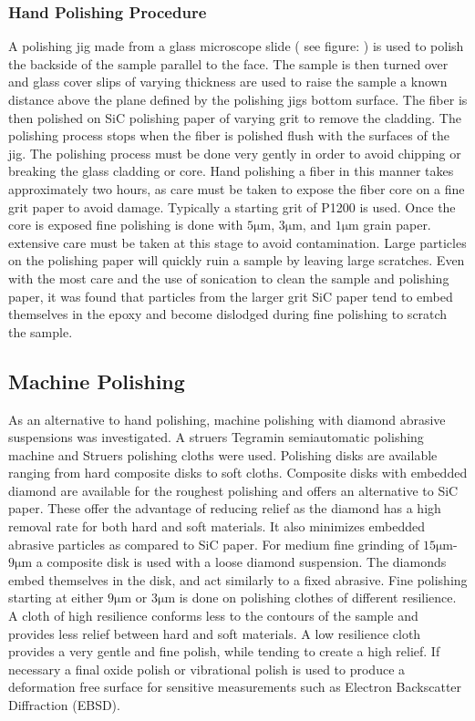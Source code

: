 \subsubsection{Hand Polishing Procedure}
A polishing jig made from a glass microscope slide ( see figure: ) is used to polish the backside of the sample parallel to the face. The sample is then turned over and glass cover slips of varying thickness are used to raise the sample a known distance above the plane defined by the polishing jigs bottom surface. The fiber is then polished on SiC polishing paper of varying grit to remove the cladding. The polishing process stops when the fiber is polished flush with the surfaces of the jig. The polishing process must be done very gently in order to avoid chipping or breaking the glass cladding or core. Hand polishing a fiber in this manner takes approximately two hours, as care must be taken to expose the fiber core on a fine grit paper to avoid damage. Typically a  starting grit of P1200 is used. Once the core is exposed fine polishing is done with $5 \si{\micro\meter}$, $3 \si{\micro\meter}$, and $1 \si{\micro\meter}$ grain paper. extensive care must be taken at this stage to avoid contamination. Large particles on the polishing paper will quickly ruin a sample by leaving large scratches. Even with the most care and the use of sonication to clean the sample and polishing paper, it was found that particles from the larger grit SiC paper tend to embed themselves in the epoxy and become dislodged during fine polishing to scratch the sample. 


\subsection{Machine Polishing}


As an alternative to hand polishing, machine polishing with diamond abrasive suspensions was investigated.  A struers Tegramin semiautomatic polishing machine and Struers polishing cloths were used. Polishing disks are available ranging from hard composite disks to soft cloths. Composite disks with embedded diamond are available for the roughest polishing and offers an alternative to SiC paper. These offer the advantage of reducing relief as the diamond has a high removal rate for both hard and soft materials. It also minimizes embedded abrasive particles as compared to SiC paper. For medium fine grinding of $15\si{\micro\meter}$-$9\si{\micro\meter}$ a composite disk is used with a loose diamond suspension. The diamonds embed themselves in the disk, and act similarly to a fixed abrasive. Fine polishing starting at either $9 \si{\micro\meter}$ or $3\si{\micro\meter}$ is done on polishing clothes of different resilience. A cloth of high resilience conforms less to the contours of the sample and provides less relief between hard and soft materials. A low resilience cloth provides a very gentle and fine polish, while tending to create a high relief. If necessary a final oxide polish or vibrational polish is used to produce a deformation free surface for sensitive measurements such as Electron Backscatter Diffraction (EBSD). 


